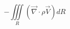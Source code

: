
\begin{equation}
-\iiint\limits_R \left( \overrightarrow{\nabla}\cdot\rho\overrightarrow{V}\right) dR
\end{equation}

